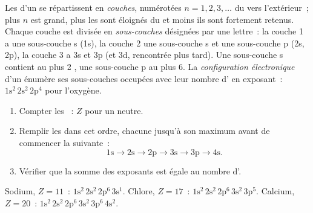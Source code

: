 \begin{definition}\label{def:g10:electron-shells:configuration}
Les  d'un  se répartissent en \emph{couches},
numérotées $n = 1, 2, 3, \ldots$ du  vers l'extérieur~; plus $n$ est
grand, plus les  sont éloignés du  et moins ils sont
fortement retenus. Chaque couche est divisée en
\emph{sous-couches} désignées par une lettre~: la
couche 1 a une sous-couche s (1s), la couche 2 une sous-couche s et une
sous-couche p (2s, 2p), la couche 3 a 3s et 3p (et 3d, rencontrée plus
tard). Une sous-couche s contient au plus 2 , une sous-couche p
au plus 6. La
\emph{configuration électronique} d'un
 énumère ses sous-couches occupées avec leur nombre d' en
exposant~: $1\mathrm{s}^2\,2\mathrm{s}^2\,2\mathrm{p}^4$ pour l'oxygène.
\end{definition}

\begin{method}[Écrire une configuration électronique, jusqu'à $Z = 20$]\label{met:g10:electron-shells:write}
\begin{enumerate}
  \item Compter les ~: $Z$ pour un  neutre.
  \item Remplir les  dans cet ordre, chacune jusqu'à son
        maximum avant de commencer la suivante~:
        \[
          1\mathrm{s} \to 2\mathrm{s} \to 2\mathrm{p} \to 3\mathrm{s} \to
          3\mathrm{p} \to 4\mathrm{s}.
        \]
  \item Vérifier que la somme des exposants est égale au nombre
        d'.
\end{enumerate}
Sodium, $Z = 11$~: $1\mathrm{s}^2\,2\mathrm{s}^2\,2\mathrm{p}^6\,3\mathrm{s}^1$.
Chlore, $Z = 17$~: $1\mathrm{s}^2\,2\mathrm{s}^2\,2\mathrm{p}^6\,3\mathrm{s}^2\,3\mathrm{p}^5$.
Calcium, $Z = 20$~: $1\mathrm{s}^2\,2\mathrm{s}^2\,2\mathrm{p}^6\,3\mathrm{s}^2\,3\mathrm{p}^6\,4\mathrm{s}^2$.
\end{method}

